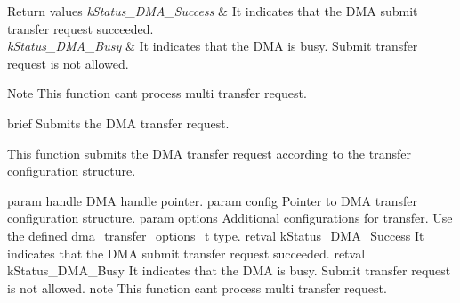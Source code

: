 \begin{DoxyRetVals}{Return values}
{\em k\+Status\+\_\+\+D\+M\+A\+\_\+\+Success} & It indicates that the D\+MA submit transfer request succeeded. \\
\hline
{\em k\+Status\+\_\+\+D\+M\+A\+\_\+\+Busy} & It indicates that the D\+MA is busy. Submit transfer request is not allowed. \\
\hline
\end{DoxyRetVals}
\begin{DoxyNote}{Note}
This function can\textquotesingle{}t process multi transfer request.
\end{DoxyNote}
brief Submits the D\+MA transfer request.

This function submits the D\+MA transfer request according to the transfer configuration structure.

param handle D\+MA handle pointer. param config Pointer to D\+MA transfer configuration structure. param options Additional configurations for transfer. Use the defined dma\+\_\+transfer\+\_\+options\+\_\+t type. retval k\+Status\+\_\+\+D\+M\+A\+\_\+\+Success It indicates that the D\+MA submit transfer request succeeded. retval k\+Status\+\_\+\+D\+M\+A\+\_\+\+Busy It indicates that the D\+MA is busy. Submit transfer request is not allowed. note This function can\textquotesingle{}t process multi transfer request. 